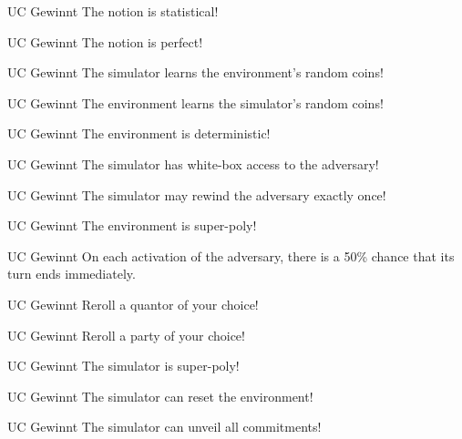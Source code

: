 \documentclass[avery5371,frame,grid]{flashcards}
\newcommand{\stopcard}{\\ \vspace{2em} \Huge \Stopsign}
\begin{document}
\begin{flashcard}{UC Gewinnt}
  The notion is statistical!
  \stopcard
\end{flashcard}
\begin{flashcard}{UC Gewinnt}
  The notion is perfect!
  \stopcard
\end{flashcard}
\begin{flashcard}{UC Gewinnt}
  The simulator learns the environment's random coins!
  \stopcard
\end{flashcard}
\begin{flashcard}{UC Gewinnt}
  The environment learns the simulator's random coins!
  \stopcard
\end{flashcard}
\begin{flashcard}{UC Gewinnt}
  The environment is deterministic!
  \stopcard
\end{flashcard}
\begin{flashcard}{UC Gewinnt}
  The simulator has white-box access to the adversary!
  \stopcard
\end{flashcard}
\begin{flashcard}{UC Gewinnt}
  The simulator may rewind the adversary exactly once!
  \stopcard
\end{flashcard}
\begin{flashcard}{UC Gewinnt}
  The environment is super-poly!
  \stopcard
\end{flashcard}
\begin{flashcard}{UC Gewinnt}
  On each activation of the adversary, there is a 50\% chance that its turn ends immediately. 
  \stopcard
\end{flashcard}
\begin{flashcard}{UC Gewinnt}
  Reroll a quantor of your choice!
  \stopcard
\end{flashcard}
\begin{flashcard}{UC Gewinnt}
  Reroll a party of your choice!
  \stopcard
\end{flashcard}
\begin{flashcard}{UC Gewinnt}
  The simulator is super-poly!
  \stopcard
\end{flashcard}
\begin{flashcard}{UC Gewinnt}
  The simulator can reset the environment!
  \stopcard
\end{flashcard}
\begin{flashcard}{UC Gewinnt}
  The simulator can unveil all commitments!
  \stopcard
\end{flashcard}
\end{document}
